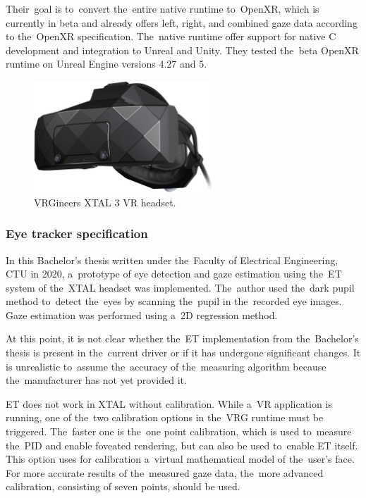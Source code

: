 Their~goal is to~convert the~entire native runtime to~OpenXR, which is currently in beta and already offers left, right, and combined gaze data according to the~OpenXR specification. The~native runtime offer support for native C development and integration to Unreal and Unity. They tested the~beta OpenXR runtime on Unreal Engine versions 4.27 and 5.~\cite{vrginners-email}

\begin{figure}[!t]\centering
    \includegraphics[width=0.6\textwidth]{img/xtal3.png}
    \caption[VRGineers XTAL 3 VR headset.]{VRGineers XTAL 3 VR headset.~\cite{vrgineers-xtal3-image}}
    \label{fig:vrg-xtal3}
\end{figure}

\subsubsection*{Eye tracker specification}
In this Bachelor's thesis written under the~Faculty of Electrical Engineering, CTU in 2020, a~prototype of eye detection and gaze estimation using the~ET system of the~XTAL headset was implemented. The~author used the~dark pupil method to~detect the~eyes by scanning the~pupil in the~recorded eye images. Gaze estimation was performed using a~2D regression method.~\cite{trnka2020thesis}

At this point, it is not clear whether the~ET implementation from the~Bachelor's thesis is present in the~current driver or if it has undergone significant changes. It is unrealistic to~assume the~accuracy of the~measuring algorithm because the~manufacturer has not yet provided it. 

ET does not work in XTAL without calibration. While a~VR application is running, one of the~two calibration options in the~VRG runtime must be triggered. The~faster one is the~one point calibration, which is used to~measure the~PID and enable foveated rendering, but can also be used to~enable ET itself. This option uses for calibration a~virtual mathematical model of the~user's face. For more accurate results of the~measured gaze data, the~more advanced calibration, consisting of seven points, should be used.~\cite{vrginners-xtal3-intro, vrginners-email}

